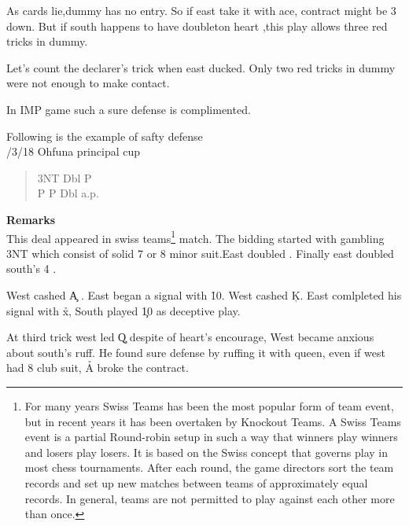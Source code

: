 {As cards lie,dummy has no entry. So if east take it with ace,
contract might be 3 down.
But if south happens to have doubleton heart ,this play allows three red
tricks in dummy.

Let's count the declarer's trick when east ducked. Only two
red tricks in dummy were not enough to make contact.

In IMP game such a sure defense is complimented.



Following is the example of safty defense\\
/3/18 Ohfuna principal cup 
\begin{quote}
%
  {}%
  {}%
  {}%
  {}%
\end{quote}
\begin{quote}
\begin{bidding}
3NT  \> Dbl \> P \s   \\
P \> P \>Dbl \> a.p. \\
\end{bidding}
 \end{quote}
{\bf Remarks}\\

This deal appeared in swiss teams\footnote{
For many years Swiss Teams has been the most popular form of team event, but in recent years it has been overtaken by Knockout Teams. A Swiss Teams event is a partial Round-robin setup in such a way that winners play winners and losers play losers. It is based on the Swiss concept that governs play in most chess tournaments.
After each round, the game directors sort the team records and set up new matches between teams of approximately equal records. In general, teams are not permitted to play against each other more than once.} match. 
The bidding started with gambling 3NT which consist of solid  7 or 8 minor suit.East doubled . Finally east doubled south's 4 \s.

West cashed \c A . East began a signal with \h 10. West cashed \c K.
East comlpleted his signal with \h x, South played \c 10 as deceptive play.

At third trick west led \c Q despite of heart's encourage,
West became anxious about south's ruff. He found sure defense by ruffing
 it with queen, even if west had 8 club suit, \h A broke the contract.

}
